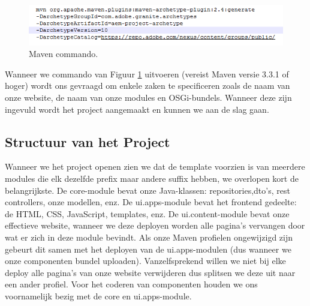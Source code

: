 \documentclass{article}
\begin{document}
	\begin{figure}[h!]
  		\includegraphics[width=\linewidth]{images/maven-archetype.PNG}
  		\caption{Maven commando.}
  		\label{fig:maven-archetype}
	\end{figure}

Wanneer we commando van Figuur \ref{fig:maven-archetype} uitvoeren (vereist Maven versie 3.3.1 of hoger) wordt ons gevraagd om enkele zaken te specificeren zoals de naam van onze website, de naam van onze modules en OSGi-bundels. Wanneer deze zijn ingevuld wordt het project aangemaakt en kunnen we aan de slag gaan.
	\subsection{Structuur van het Project}
	Wanneer we het project openen zien we dat de template voorzien is van meerdere modules die elk dezelfde prefix maar andere suffix hebben, we overlopen kort de belangrijkste. De core-module bevat onze Java-klassen: repositories,dto's, rest controllers, onze modellen, enz. De ui.apps-module bevat het frontend gedeelte: de HTML, CSS, JavaScript, templates, enz. De ui.content-module bevat onze effectieve website, wanneer we deze deployen worden alle pagina's vervangen door wat er zich in deze module bevindt. Als onze Maven profielen ongewijzigd zijn gebeurt dit samen met het deployen van de ui.apps-modulen (dus wanneer we onze componenten bundel uploaden). Vanzelfsprekend willen we niet bij elke deploy alle pagina's van onze website verwijderen dus splitsen we deze uit naar een ander profiel. Voor het coderen van componenten houden we ons voornamelijk bezig met de core en ui.apps-module.
\end{document}
